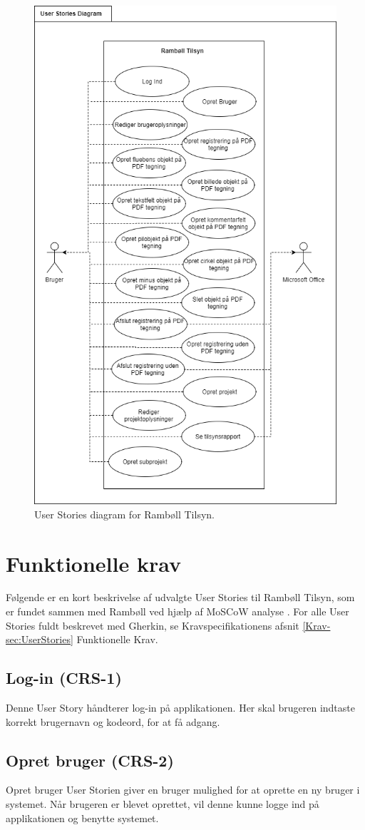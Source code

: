 	\begin{figure}[H]
		\centering
		\includegraphics[width=0.6\linewidth]{Kravspecifikation/UserStorieDiagram}
		\caption{User Stories diagram for Rambøll Tilsyn.}
		\label{fig:Userstoriediagram}
	\end{figure}
	
	\clearpage
	
\section{Funktionelle krav} \label{sec:UserS}
	Følgende er en kort beskrivelse af udvalgte User Stories til Rambøll Tilsyn, som er fundet sammen med Rambøll ved hjælp af MoSCoW analyse \cite{MoSCoW}. For alle User Stories fuldt beskrevet med Gherkin, se Kravspecifikationens afsnit \ref{Krav-sec:UserStories} Funktionelle Krav.

	\subsection*{Log-in (CRS-1)}
	Denne User Story håndterer log-in på applikationen. Her skal brugeren indtaste korrekt brugernavn og kodeord, for at få adgang.
	
	\subsection*{Opret bruger (CRS-2)}
	Opret bruger User Storien giver en bruger mulighed for at oprette en ny bruger i systemet. Når brugeren er blevet oprettet, vil denne kunne logge ind på applikationen og benytte systemet.
	
